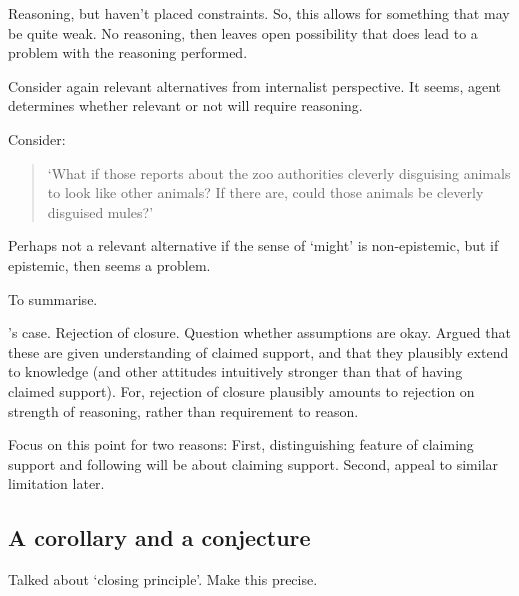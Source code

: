 \begin{note}
  Reasoning, but haven't placed constraints.
  So, this allows for something that may be quite weak.
  No reasoning, then leaves open possibility that does lead to a problem with the reasoning performed.

  Consider again relevant alternatives from internalist perspective.
  It seems, agent determines whether relevant or not will require reasoning.

  Consider:
  \begin{quote}
    `What if those reports about the zoo authorities cleverly disguising animals to look like other animals?
    If there are, could those animals be cleverly disguised mules?'
  \end{quote}
  Perhaps not a relevant alternative if the sense of `might' is non-epistemic, but if epistemic, then seems a problem.
\end{note}

\begin{note}
  To summarise.

  \citeauthor{Dretske:1970to}'s case.
  Rejection of closure.
  Question whether assumptions are okay.
  Argued that these are given understanding of claimed support, and that they plausibly extend to knowledge (and other attitudes intuitively stronger than that of having claimed support).
  For, rejection of closure plausibly amounts to rejection on strength of reasoning, rather than requirement to reason.

  Focus on this point for two reasons:
  First, distinguishing feature of claiming support and following will be about claiming support.
  Second, appeal to similar limitation later.
\end{note}

\newpage

\subsection{A corollary and a conjecture}

\begin{note}
  Talked about `closing principle'.
  Make this precise.
\end{note}

